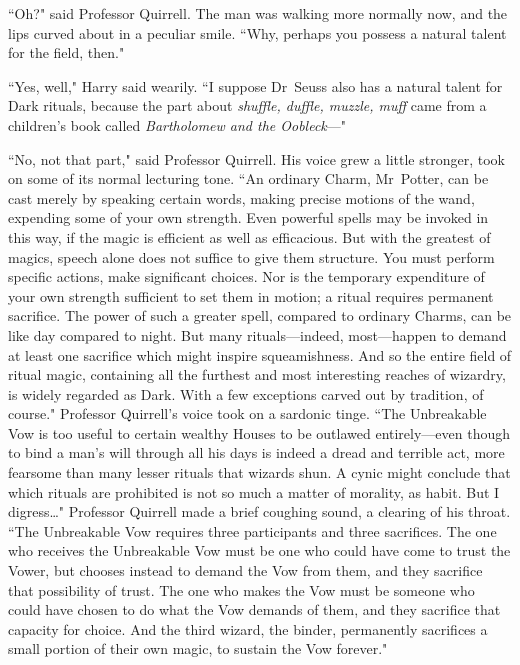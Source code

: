 ``Oh?" said Professor Quirrell. The man was walking more normally now, and the lips curved about in a peculiar smile. ``Why, perhaps you possess a natural talent for the field, then."

``Yes, well," Harry said wearily. ``I suppose Dr~Seuss also has a natural talent for Dark rituals, because the part about \emph{shuffle, duffle, muzzle, muff} came from a children's book called \emph{Bartholomew and the Oobleck}—"

``No, not that part," said Professor Quirrell. His voice grew a little stronger, took on some of its normal lecturing tone. ``An ordinary Charm, Mr~Potter, can be cast merely by speaking certain words, making precise motions of the wand, expending some of your own strength. Even powerful spells may be invoked in this way, if the magic is efficient as well as efficacious. But with the greatest of magics, speech alone does not suffice to give them structure. You must perform specific actions, make significant choices. Nor is the temporary expenditure of your own strength sufficient to set them in motion; a ritual requires permanent sacrifice. The power of such a greater spell, compared to ordinary Charms, can be like day compared to night. But many rituals—indeed, most—happen to demand at least one sacrifice which might inspire squeamishness. And so the entire field of ritual magic, containing all the furthest and most interesting reaches of wizardry, is widely regarded as Dark. With a few exceptions carved out by tradition, of course." Professor Quirrell's voice took on a sardonic tinge. ``The Unbreakable Vow is too useful to certain wealthy Houses to be outlawed entirely—even though to bind a man's will through all his days is indeed a dread and terrible act, more fearsome than many lesser rituals that wizards shun. A cynic might conclude that which rituals are prohibited is not so much a matter of morality, as habit. But I digress{\ldots}" Professor Quirrell made a brief coughing sound, a clearing of his throat. ``The Unbreakable Vow requires three participants and three sacrifices. The one who receives the Unbreakable Vow must be one who could have come to trust the Vower, but chooses instead to demand the Vow from them, and they sacrifice that possibility of trust. The one who makes the Vow must be someone who could have chosen to do what the Vow demands of them, and they sacrifice that capacity for choice. And the third wizard, the binder, permanently sacrifices a small portion of their own magic, to sustain the Vow forever."

